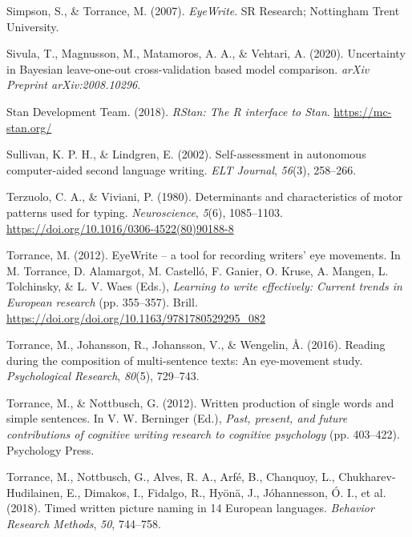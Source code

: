 \documentclass[
  man,floatsintext]{apa7}
\newlength{\cslhangindent}
\newlength{\cslentryspacingunit} %
\newenvironment{CSLReferences}[2] %
 {%
  \setlength{\parindent}{0pt}
  \ifodd #1
  \let\oldpar\par
  \def\par{\hangindent=\cslhangindent\oldpar}
  \fi
  \setlength{\parskip}{#2\cslentryspacingunit}
 }%
 {}
\begin{document}
\begin{CSLReferences}{1}{0}
\leavevmode{}%
Simpson, S., \& Torrance, M. (2007). \emph{EyeWrite}. SR Research; Nottingham Trent University.

\leavevmode{}%
Sivula, T., Magnusson, M., Matamoros, A. A., \& Vehtari, A. (2020). Uncertainty in {B}ayesian leave-one-out cross-validation based model comparison. \emph{arXiv Preprint arXiv:2008.10296}.

\leavevmode{}%
Stan Development Team. (2018). \emph{{RStan}: The {R} interface to {Stan}}. \url{https://mc-stan.org/}

\leavevmode{}%
Sullivan, K. P. H., \& Lindgren, E. (2002). Self-assessment in autonomous computer-aided second language writing. \emph{ELT Journal}, \emph{56}(3), 258--266.

\leavevmode{}%
Terzuolo, C. A., \& Viviani, P. (1980). Determinants and characteristics of motor patterns used for typing. \emph{Neuroscience}, \emph{5}(6), 1085--1103. \url{https://doi.org/10.1016/0306-4522(80)90188-8}

\leavevmode{}%
Torrance, M. (2012). EyeWrite -- a tool for recording writers' eye movements. In M. Torrance, D. Alamargot, M. Castelló, F. Ganier, O. Kruse, A. Mangen, L. Tolchinsky, \& L. V. Waes (Eds.), \emph{Learning to write effectively: Current trends in {E}uropean research} (pp. 355--357). Brill. \url{https://doi.org/doi.org/10.1163/9781780529295_082}

\leavevmode{}%
Torrance, M., Johansson, R., Johansson, V., \& Wengelin, Å. (2016). Reading during the composition of multi-sentence texts: An eye-movement study. \emph{Psychological Research}, \emph{80}(5), 729--743.

\leavevmode{}%
Torrance, M., \& Nottbusch, G. (2012). Written production of single words and simple sentences. In V. W. Berninger (Ed.), \emph{Past, present, and future contributions of cognitive writing research to cognitive psychology} (pp. 403--422). Psychology Press.

\leavevmode{}%
Torrance, M., Nottbusch, G., Alves, R. A., Arfé, B., Chanquoy, L., Chukharev-Hudilainen, E., Dimakos, I., Fidalgo, R., Hyönä, J., Jóhannesson, Ó. I., et al. (2018). Timed written picture naming in 14 {E}uropean languages. \emph{Behavior Research Methods}, \emph{50}, 744--758.


\end{CSLReferences}
\end{document}
